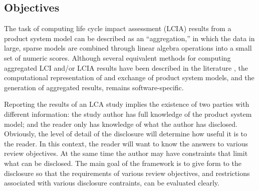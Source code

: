 \subsection{Objectives}

The task of computing life cycle impact assessment (LCIA) results from a product system model can be described as an ``aggregation,'' in which the data in large, sparse models are combined through linear algebra operations into a small set of numeric scores.  Although several equivalent methods for computing aggregated LCI and/or LCIA results have been described in the literature \citep{Suh2005a, Peters_JLCA_2007}, the computational representation of and exchange of product system models, and the generation of aggregated results, remains software-specific.  

Reporting the results of an LCA study implies the existence of two parties with different information: the study author has full knowledge of the product system model; and the reader only has knowledge of what the author has disclosed.  Obviously, the level of detail of the disclosure will determine how useful it is to the reader.  In this context, the reader will want to know the answers to various review objectives.  
At the same time the author may have constraints that limit what can be disclosed.  The main goal of the framework is to give form to the disclosure so that the requirements of various review objectives, and restrictions associated with various disclosure contraints, can be evaluated clearly.

